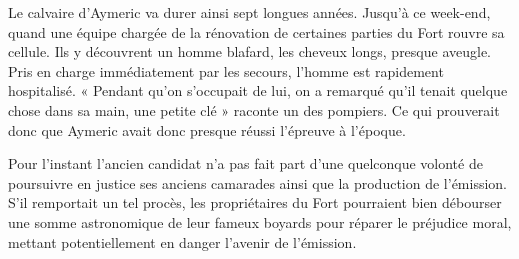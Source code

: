 \documentclass[11pt,a4paper]{article}
\begin{document}
{Le calvaire d’Aymeric va durer ainsi sept longues années. Jusqu’à ce week-end, quand une équipe chargée de la rénovation de certaines parties du Fort rouvre sa cellule. Ils y découvrent un homme blafard, les cheveux longs, presque aveugle. Pris en charge immédiatement par les secours, l’homme est rapidement hospitalisé. « Pendant qu’on s’occupait de lui, on a remarqué qu’il tenait quelque chose dans sa main, une petite clé » raconte un des pompiers. Ce qui prouverait donc que Aymeric avait donc presque réussi l’épreuve à l’époque.

Pour l’instant l’ancien candidat n’a pas fait part d’une quelconque volonté de poursuivre en justice ses anciens camarades ainsi que la production de l’émission. S’il remportait un tel procès, les propriétaires du Fort pourraient bien débourser une somme astronomique de leur fameux boyards pour réparer le préjudice moral, mettant potentiellement en danger l’avenir de l’émission.

}
\end{document}
